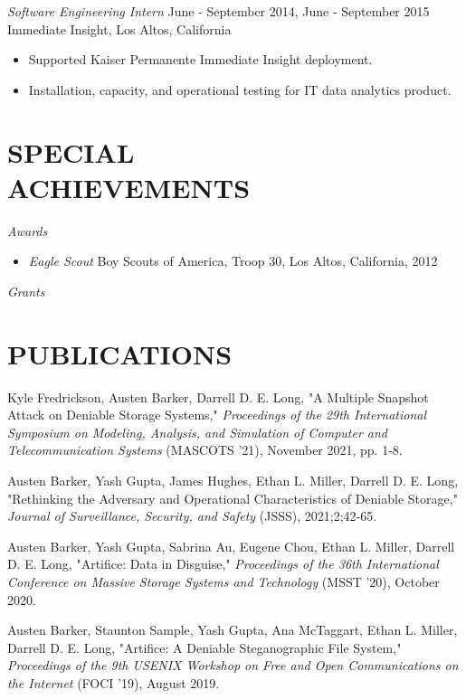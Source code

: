 \documentclass[margin, 10pt]{res} %
\begin{document}
\begin{resume}
{\sl Software Engineering Intern} \hfill June - September 2014, June - September 2015 \\
Immediate Insight, Los Altos, California
\begin{itemize}
\item Supported Kaiser Permanente Immediate Insight deployment.
\item Installation, capacity, and operational testing for IT data analytics product.
\end{itemize}

\section{SPECIAL \\ ACHIEVEMENTS} 
{\sl Awards}
\begin{itemize}
\item \emph{Eagle Scout} Boy Scouts of America, Troop 30, Los Altos, California, 2012
\end{itemize}
{\sl Grants}


\section{PUBLICATIONS}
\begin{etaremune}
\item Kyle Fredrickson, Austen Barker, Darrell D. E. Long, "A Multiple Snapshot Attack on Deniable Storage Systems," \emph{Proceedings of the 29th International Symposium on Modeling, Analysis, and Simulation of Computer and 
Telecommunication Systems} (MASCOTS '21), November 2021, pp. 1-8.
\item Austen Barker, Yash Gupta, James Hughes, Ethan L. Miller, Darrell D. E. Long, "Rethinking the Adversary and Operational Characteristics of Deniable Storage," \emph{Journal of Surveillance, Security, and Safety} (JSSS), 2021;2;42-65.
\item Austen Barker, Yash Gupta, Sabrina Au, Eugene Chou, Ethan L. Miller, Darrell D. E. Long, "Artifice: Data in Disguise," \emph{Proceedings of the 36th International Conference on Massive Storage Systems and Technology} (MSST '20), October 2020.
\item Austen Barker, Staunton Sample, Yash Gupta, Ana McTaggart, Ethan L. Miller, Darrell D. E. Long, "Artifice: A Deniable Steganographic File System," \emph{Proceedings of the 9th USENIX Workshop on Free and Open Communications on the Internet} (FOCI '19), August 2019.
\end{etaremune}
\end{resume}
\end{document}

